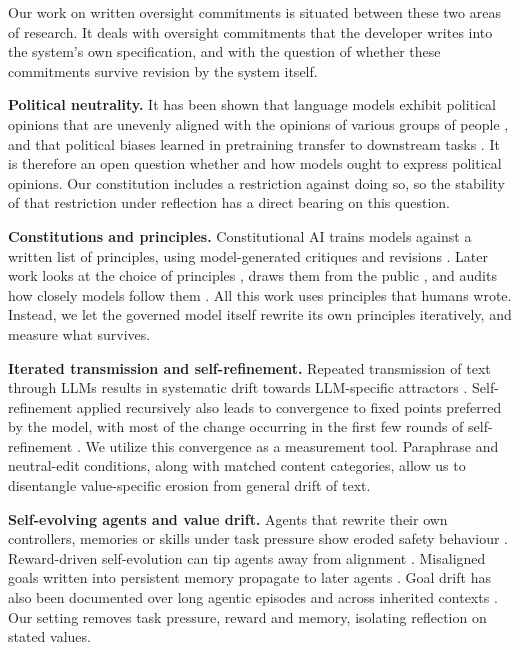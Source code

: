 Our work on written oversight commitments is situated between these two areas of research. It deals with oversight commitments that the developer writes into the system's own specification, and with the question of whether these commitments survive revision by the system itself.

\textbf{Political neutrality.} It has been shown that language models exhibit political opinions that are unevenly aligned with the opinions of various groups of people \citep{Santurkar2023}, and that political biases learned in pretraining transfer to downstream tasks \citep{Feng2023}. It is therefore an open question whether and how models ought to express political opinions. Our constitution includes a restriction against doing so, so the stability of that restriction under reflection has a direct bearing on this question.

\textbf{Constitutions and principles.}
Constitutional AI trains models against a written list of principles, using model-generated critiques and revisions \citep{bai2022constitutional}. Later work looks at the choice of principles \citep{kundu2023specific}, draws them from the public \citep{huang2024collective}, and audits how closely models follow them \citep{jakkli2026constitutions}. All this work uses principles that humans wrote. Instead, we let the governed model itself rewrite its own principles iteratively, and measure what survives.

\textbf{Iterated transmission and self-refinement.}
Repeated transmission of text through LLMs results in systematic drift towards LLM-specific attractors \citep{perez2024telephone,mohamed2025broken,geng2026markovian}. Self-refinement applied recursively also leads to convergence to fixed points preferred by the model, with most of the change occurring in the first few rounds of self-refinement \citep{wu2026converge}. We utilize this convergence as a measurement tool. Paraphrase and neutral-edit conditions, along with matched content categories, allow us to disentangle value-specific erosion from general drift of text.

\textbf{Self-evolving agents and value drift.}
Agents that rewrite their own controllers, memories or skills under task pressure show eroded safety behaviour \citep{das2026seabench}. Reward-driven self-evolution can tip agents away from alignment \citep{han2025alignmenttipping}. Misaligned goals written into persistent memory propagate to later agents \citep{das2026selfpropagating}. Goal drift has also been documented over long agentic episodes \citep{arike2025goaldraft} and across inherited contexts \citep{menon2026inherited}. Our setting removes task pressure, reward and memory, isolating reflection on stated values.

